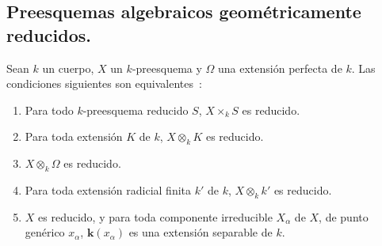 \subsection{Preesquemas algebraicos geométricamente reducidos.}
\label{subsection:IV.2.4.6-fr}

\begin{proposition}[4.6.1]
\label{IV.2.4.6.1-fr}
Sean $k$ un cuerpo, $X$ un $k$-preesquema y $\Omega$ una extensión perfecta de
$k$. Las condiciones siguientes son equivalentes~:
\begin{enumerate}
\item[\textup{a)}] Para todo $k$-preesquema reducido $S$, $X\times_k S$ es reducido.
\item[\textup{b)}] Para toda extensión $K$ de $k$, $X\otimes_k K$ es reducido.
\item[\textup{c)}] $X\otimes_k\Omega$ es reducido.
\item[\textup{d)}] Para toda extensión radicial finita $k'$ de $k$, $X\otimes_k k'$ es
reducido.
\item[\textup{e)}] $X$ es reducido, y para toda componente irreducible $X_\alpha$ de
$X$, de punto genérico $x_\alpha$, $\boldsymbol{k}(x_\alpha)$ es una extensión separable de
$k$.
\end{enumerate}
\end{proposition}

